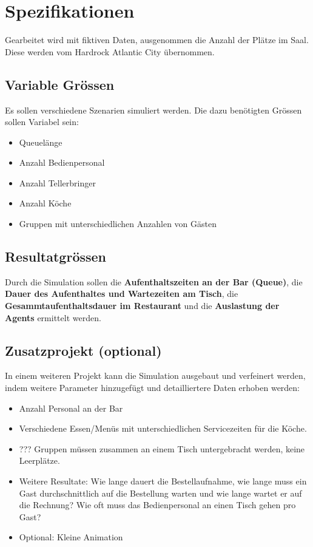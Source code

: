 \documentclass[ngerman,a4paper,12pt]{scrreprt}
\begin{document}
\section{Spezifikationen}
	Gearbeitet wird mit fiktiven Daten, ausgenommen die Anzahl der Plätze im Saal. Diese werden vom Hardrock Atlantic City übernommen.

	\subsection{Variable Grössen}
		Es sollen verschiedene Szenarien simuliert werden. Die dazu benötigten Grössen sollen Variabel sein:
		\begin{itemize}
			\item Queuelänge
			\item Anzahl Bedienpersonal
			\item Anzahl Tellerbringer
			\item Anzahl Köche
			\item Gruppen mit unterschiedlichen Anzahlen von Gästen
		\end{itemize}

	\subsection{Resultatgrössen}
		Durch die Simulation sollen die \textbf{Aufenthaltszeiten an der Bar (Queue)}, die \textbf{Dauer des Aufenthaltes und Wartezeiten am Tisch}, die \textbf{Gesammtaufenthaltsdauer im Restaurant} und die \textbf{Auslastung der Agents} ermittelt werden.

\subsection{Zusatzprojekt (optional)}
	In einem weiteren Projekt kann die Simulation ausgebaut und verfeinert werden, indem weitere Parameter hinzugefügt  und detailliertere Daten erhoben werden:
	\begin{itemize}
		\item Anzahl Personal an der Bar
		\item Verschiedene Essen/Menüs mit unterschiedlichen Servicezeiten für die Köche.
		\item ??? Gruppen müssen zusammen an einem Tisch untergebracht werden, keine Leerplätze.
		\item Weitere Resultate: Wie lange dauert die Bestellaufnahme, wie lange muss ein Gast durchschnittlich auf die Bestellung warten und wie lange wartet er auf die Rechnung? Wie oft muss das Bedienpersonal an einen Tisch gehen pro Gast?
		\item Optional: Kleine Animation
	\end{itemize}
\end{document}
